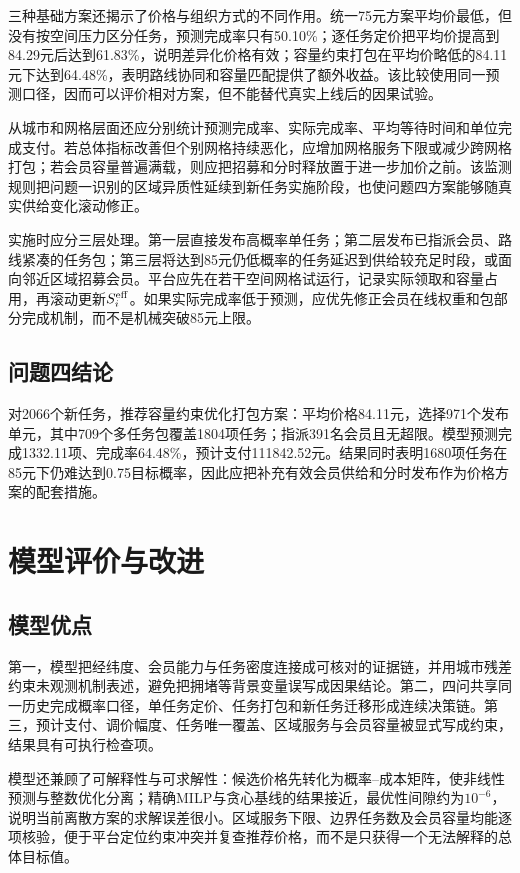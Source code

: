 ﻿\documentclass[UTF8,zihao=-4,a4paper,fontset=fandol]{ctexart}
\begin{document}
三种基础方案还揭示了价格与组织方式的不同作用。统一75元方案平均价最低，但没有按空间压力区分任务，预测完成率只有50.10\%；逐任务定价把平均价提高到84.29元后达到61.83\%，说明差异化价格有效；容量约束打包在平均价略低的84.11元下达到64.48\%，表明路线协同和容量匹配提供了额外收益。该比较使用同一预测口径，因而可以评价相对方案，但不能替代真实上线后的因果试验。

从城市和网格层面还应分别统计预测完成率、实际完成率、平均等待时间和单位完成支付。若总体指标改善但个别网格持续恶化，应增加网格服务下限或减少跨网格打包；若会员容量普遍满载，则应把招募和分时释放置于进一步加价之前。该监测规则把问题一识别的区域异质性延续到新任务实施阶段，也使问题四方案能够随真实供给变化滚动修正。

实施时应分三层处理。第一层直接发布高概率单任务；第二层发布已指派会员、路线紧凑的任务包；第三层将达到85元仍低概率的任务延迟到供给较充足时段，或面向邻近区域招募会员。平台应先在若干空间网格试运行，记录实际领取和容量占用，再滚动更新$S_i^{\rm eff}$。如果实际完成率低于预测，应优先修正会员在线权重和包部分完成机制，而不是机械突破85元上限。

\subsection{问题四结论}

对2066个新任务，推荐容量约束优化打包方案：平均价格84.11元，选择971个发布单元，其中709个多任务包覆盖1804项任务；指派391名会员且无超限。模型预测完成1332.11项、完成率64.48\%，预计支付111842.52元。结果同时表明1680项任务在85元下仍难达到0.75目标概率，因此应把补充有效会员供给和分时发布作为价格方案的配套措施。

\section{模型评价与改进}

\subsection{模型优点}

第一，模型把经纬度、会员能力与任务密度连接成可核对的证据链，并用城市残差约束未观测机制表述，避免把拥堵等背景变量误写成因果结论。第二，四问共享同一历史完成概率口径，单任务定价、任务打包和新任务迁移形成连续决策链。第三，预计支付、调价幅度、任务唯一覆盖、区域服务与会员容量被显式写成约束，结果具有可执行检查项。

模型还兼顾了可解释性与可求解性：候选价格先转化为概率--成本矩阵，使非线性预测与整数优化分离；精确MILP与贪心基线的结果接近，最优性间隙约为$10^{-6}$，说明当前离散方案的求解误差很小。区域服务下限、边界任务数及会员容量均能逐项核验，便于平台定位约束冲突并复查推荐价格，而不是只获得一个无法解释的总体目标值。
\end{document}
